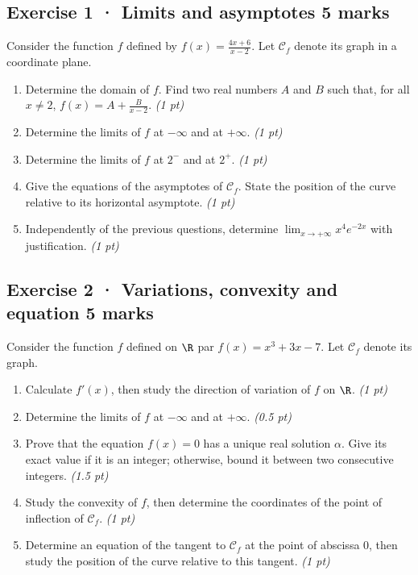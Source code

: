 \subsection*{Exercise 1 · Limits and asymptotes \hfill 5 marks}Consider the function $f$ defined by $f(x)=\frac{4x+6}{x-2}$. Let $\mathcal C_f$ denote its graph in a coordinate plane.

\begin{enumerate}

\item Determine the domain of $f$. Find two real numbers $A$ and $B$ such that, for all $x\ne2$, $f(x)=A+\frac B{x-2}$. \hfill\textit{(1 pt)}

\item Determine the limits of $f$ at $-\infty$ and at $+\infty$. \hfill\textit{(1 pt)}

\item Determine the limits of $f$ at $2^-$ and at $2^+$. \hfill\textit{(1 pt)}

\item Give the equations of the asymptotes of $\mathcal C_f$. State the position of the curve relative to its horizontal asymptote. \hfill\textit{(1 pt)}

\item Independently of the previous questions, determine $\displaystyle\lim_{x\to+\infty}x^{4}e^{-2x}$ with justification. \hfill\textit{(1 pt)}

\end{enumerate}

\subsection*{Exercise 2 · Variations, convexity and equation \hfill 5 marks}Consider the function $f$ defined on $\R$ par $f(x)=x^3+3x-7$. Let $\mathcal C_f$ denote its graph.

\begin{enumerate}

\item Calculate $f'(x)$, then study the direction of variation of $f$ on $\R$. \hfill\textit{(1 pt)}

\item Determine the limits of $f$ at $-\infty$ and at $+\infty$. \hfill\textit{(0.5 pt)}

\item Prove that the equation $f(x)=0$ has a unique real solution $\alpha$. Give its exact value if it is an integer; otherwise, bound it between two consecutive integers. \hfill\textit{(1.5 pt)}

\item Study the convexity of $f$, then determine the coordinates of the point of inflection of $\mathcal C_f$. \hfill\textit{(1 pt)}

\item Determine an equation of the tangent to $\mathcal C_f$ at the point of abscissa $0$, then study the position of the curve relative to this tangent. \hfill\textit{(1 pt)}

\end{enumerate}

